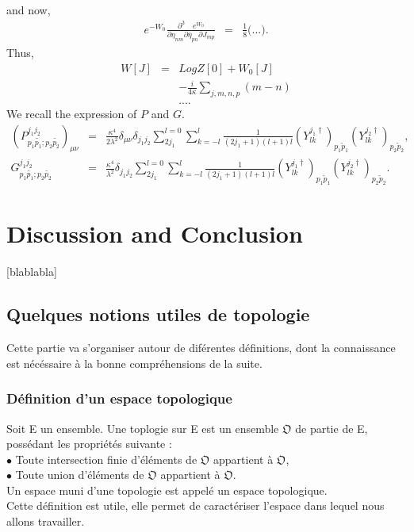 \documentclass[a4paper,11pt]{article} %
\numberwithin{equation}{section} %
\numberwithin{figure}{section} %
\theoremstyle{plain} %
\theoremstyle{definition} %
\theoremstyle{remark} %
\begin{document}
and now,
\begin{eqnarray*}
 e^{-W_{0}} \frac{\partial^{3} \quad e^{W_{0}}}{\partial \eta_{n m} \partial \bar{\eta}_{pn} \partial J_{mp}} &=&  \frac{1}{8}
 \Bigg( ... \Bigg).
\end{eqnarray*}
Thus,
\begin{eqnarray*}
 W[J] &=& Log Z[0] + W_{0}[J] \\
      && -  \frac{i}{4 \kappa} \sum_{j, m, n, p} (m-n) \\
      && ... .
\end{eqnarray*}
We recall the expression of $P$ and $G$.
\begin{eqnarray*}
 (P^{j_1 j_2 }_{p_1 \tilde{p_1} ; p_2 \tilde{p_2} })_{\mu \nu} &=& \frac{\kappa^4}{2 \lambda^2} \delta_{\mu \nu} \delta_{j_1 j_2}  \sum_{2 j_1}^{l=0} \sum_{k=-l}^{l} \frac{1}{(2j_1 + 1)(l+1)l} (Y^{j_1 \dagger}_{l k})_{p_1 \tilde{p}_1 } (Y^{j_2 \dagger}_{l k})_{p_2 \tilde{p}_2 } ,\\
 G^{j_1 j_2 }_{p_1 \tilde{p_1} ; p_2 \tilde{p_2} }             &=& \frac{\kappa^4}{\lambda^2} \delta_{j_1 j_2} \sum_{2 j_1}^{l=0} \sum_{k=-l}^{l} \frac{1}{(2 j_1 + 1)(l+1)l} (Y^{j_1 \dagger}_{l k})_{p_1 \tilde{p}_1 } (Y^{j_2 \dagger}_{l k})_{p_2 \tilde{p}_2 }.
\end{eqnarray*}

\section{Discussion and Conclusion}

[blablabla]


\subsection{Quelques notions utiles de topologie}

\noindent
Cette partie va s'organiser autour de dif\'erentes d\'efinitions, dont la connaissance est n\'ec\'essaire \`a la bonne compr\'ehensions de la suite.

\subsubsection{D\'efinition d'un espace topologique}

\noindent
Soit E un ensemble. Une toplogie sur E est un ensemble $\mathfrak{O}$ de partie de E, poss\'edant les propri\'et\'es suivante :\\
$\bullet$ \hspace{0.2cm} Toute intersection finie d'\'el\'ements de $\mathfrak{O}$ appartient \`a $\mathfrak{O}$,\\
$\bullet$ \hspace{0.2cm} Toute union d'\'el\'ements de $\mathfrak{O}$ appartient \`a $\mathfrak{O}$.\\
Un espace muni d'une topologie est appel\'e un espace topologique.\\
Cette d\'efinition est utile, elle permet de caract\'eriser l'espace dans lequel nous allons travailler.
\end{document}
